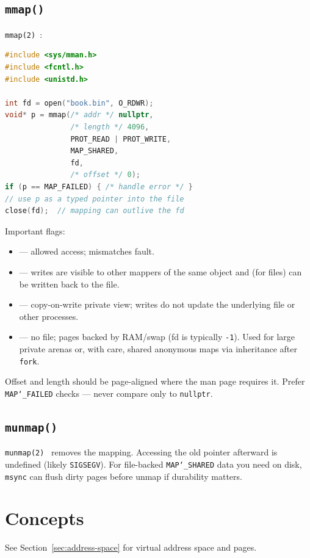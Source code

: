 \subsection{\texttt{mmap()}}
\label{subsec:mmap}
\texttt{mmap(2)}~\cite{man-mmap}:
\begin{lstlisting}[language=C++]
#include <sys/mman.h>
#include <fcntl.h>
#include <unistd.h>

int fd = open("book.bin", O_RDWR);
void* p = mmap(/* addr */ nullptr,
               /* length */ 4096,
               PROT_READ | PROT_WRITE,
               MAP_SHARED,
               fd,
               /* offset */ 0);
if (p == MAP_FAILED) { /* handle error */ }
// use p as a typed pointer into the file
close(fd);  // mapping can outlive the fd
\end{lstlisting}
Important flags:
\begin{itemize}
    \item {} 
          --- allowed access; mismatches fault.
    \item {} --- writes are visible to other mappers of the 
          same object and (for files) can be written back to the file.
    \item {} --- copy-on-write private view; writes do not 
          update the underlying file or other processes.
    \item {} --- no file; pages backed by RAM/swap 
          (fd is typically \texttt{-1}). Used for large private arenas or, with care, shared 
          anonymous maps via inheritance after \texttt{fork}.
\end{itemize}
Offset and length should be page-aligned where the man page requires it. Prefer 
\texttt{MAP\char`_FAILED} checks --- never compare only to \texttt{nullptr}.

\subsection{\texttt{munmap()}}
\label{subsec:munmap}
\texttt{munmap(2)}~\cite{man-munmap} removes the mapping. Accessing the old pointer afterward is 
undefined (likely \texttt{SIGSEGV}). For file-backed \texttt{MAP\char`_SHARED} data you need on 
disk, \texttt{msync} can flush dirty pages before unmap if durability matters.

\section{Concepts}
\label{sec:memory-mapping-concepts}
See Section~\ref{sec:address-space} for virtual address space and pages.

